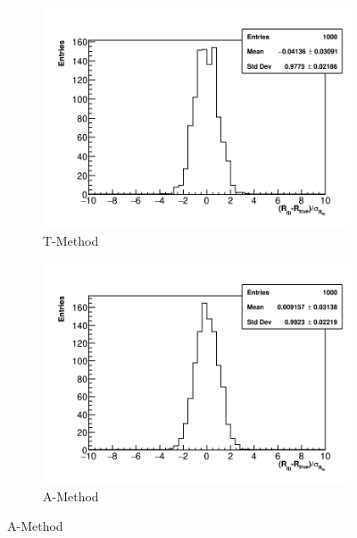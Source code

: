 \begin{figure}
\centering
    \begin{subfigure}[t]{0.45\textwidth}
        \centering
        \includegraphics[width=\textwidth]{Rpull_TMethod}
        \caption{T-Method}
    \end{subfigure}
    \hspace{1mm}
    \begin{subfigure}[t]{0.45\textwidth}
        \centering
        \includegraphics[width=\textwidth]{Rpull_AMethod}
        \caption{A-Method}
    \end{subfigure}%


\end{figure}
